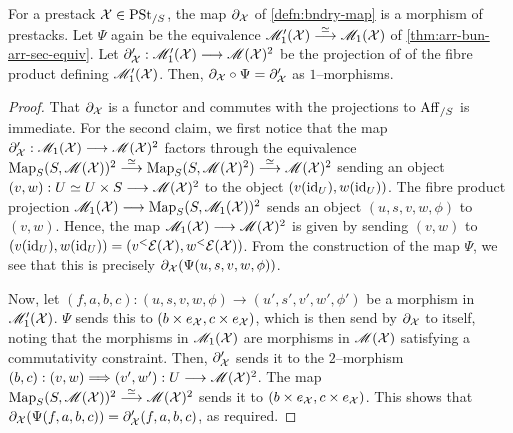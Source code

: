 \documentclass[11pt]{amsart}
\begin{document}
\begin{prop}
For a prestack $\mathcal{X} \in \mathrm{PSt}_{/S}$,
the map $\partial_\mathcal{X}$ of \cref{defn:bndry-map} is a morphism of prestacks.
Let $\Psi$ again be the equivalence
$\sM_1'(\mcX) \to[\simeq] \sM_1(\mcX)$ of \cref{thm:arr-bun-arr-sec-equiv}.
Let $\partial_\mcX' : \sM_1'(\mcX) \to \sM(\mcX)^2$ be the projection of
of the fibre product defining $\mathscr{M}_1'(\mathcal{X})$.
Then, $\partial_\mathcal{X} \circ \Psi = \partial_\mathcal{X}'$ as $1$--morphisms.
\end{prop}
\begin{proof}
That $\partial_\mathcal{X}$ is a functor and commutes with the projections
to $\mathrm{Aff}_{/S}$ is immediate. For the second claim, we first notice that
the map $\partial_\mcX' : \sM_1(\mcX) \to \sM(\mcX)^2$ factors through
the equivalence
$\Map_S(S, \sM(\mcX))^2 \to[\simeq] \Map_S(S, \sM(\mcX)^2) \to[\simeq]
\sM(\mcX)^2$ sending
an object $(v, w) : U \simeq U \times S \to \sM(\mcX)^2$ to
the object $(v(\mathrm{id}_{U}), w(\mathrm{id}_U))$. The fibre product projection
$\sM_1(\mcX) \to \Map_S(S, \sM_1(\mcX))^2$ sends an object
$(u, s, v, w, \phi)$ to $(v, w)$. Hence, the map
$\sM_1(\mcX) \to \sM(\mcX)^2$ is given by sending $(v, w)$ to
$(v(\mathrm{id}_U), w(\mathrm{id}_U)) = (v^<\mathcal{E}(\mathcal{X}), w^<\mathcal{E}(\mathcal{X}))$. From the construction
of the map $\Psi$, we see that this is precisely
$\partial_\mathcal{X}(\Psi(u, s, v, w, \phi))$.

Now, let $(f, a, b, c) : (u, s, v, w, \phi) \to (u', s', v', w', \phi')$
be a morphism in $\mathscr{M}_1'(\mathcal{X})$. $\Psi$ sends this to
$(b \times e_\mathcal{X}, c \times e_\mathcal{X})$, which is then send by $\partial_\mathcal{X}$
to itself, noting that the morphisms in $\mathscr{M}_1(\mathcal{X})$ are morphisms
in $\mathscr{M}(\mathcal{X})$ satisfying a commutativity constraint. Then, $\partial_\mathcal{X}'$
sends it to the $2$--morphism $(b, c) : (v, w) \To (v', w') : U \to \sM(\mcX)^2$.
The map $\Map_S(S, \sM(\mcX))^2 \to[\simeq] \sM(\mcX)^2$ sends it to
$(b \times e_\mathcal{X}, c \times e_\mathcal{X})$. This shows that
$\partial_\mathcal{X}(\Psi(f, a, b, c)) = \partial_\mathcal{X}'(f, a, b, c)$, as required.


\end{proof}
\end{document}
